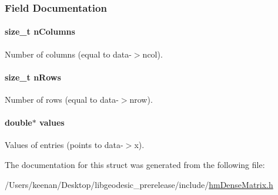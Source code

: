 \subsubsection{Field Documentation}
\hypertarget{structhm_dense_matrix_a7078245a8b4311640e4e0d4b231cfedb}{
\paragraph[{n\-Columns}]{\setlength{\rightskip}{0pt plus 5cm}size\-\_\-t n\-Columns}}\label{structhm_dense_matrix_a7078245a8b4311640e4e0d4b231cfedb}


Number of columns (equal to data-\/$>$ncol). 

\hypertarget{structhm_dense_matrix_a7fbc9f4a4303c885a43e849d118e843f}{
\paragraph[{n\-Rows}]{\setlength{\rightskip}{0pt plus 5cm}size\-\_\-t n\-Rows}}\label{structhm_dense_matrix_a7fbc9f4a4303c885a43e849d118e843f}


Number of rows (equal to data-\/$>$nrow). 

\hypertarget{structhm_dense_matrix_a2098158062e3e63fce7d2575b324c386}{
\paragraph[{values}]{\setlength{\rightskip}{0pt plus 5cm}double$\ast$ values}}\label{structhm_dense_matrix_a2098158062e3e63fce7d2575b324c386}


Values of entries (points to data-\/$>$x). 



The documentation for this struct was generated from the following file\-:\begin{DoxyCompactItemize}
\item 
/\-Users/keenan/\-Desktop/libgeodesic\-\_\-prerelease/include/\hyperlink{hm_dense_matrix_8h}{hm\-Dense\-Matrix.\-h}\end{DoxyCompactItemize}

